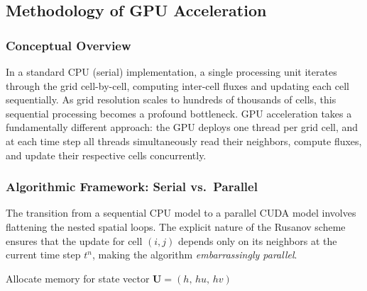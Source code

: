 \documentclass[10pt, conference]{FMFP2023}
\begin{document}
\subsection{Methodology of GPU Acceleration}

\subsubsection{Conceptual Overview}

In a standard CPU (serial) implementation, a single processing unit
iterates through the grid cell-by-cell, computing inter-cell fluxes
and updating each cell sequentially.
As grid resolution scales to hundreds of thousands of cells, this
sequential processing becomes a profound bottleneck.
GPU acceleration takes a fundamentally different approach: the GPU
deploys one thread per grid cell, and at each time step all threads
simultaneously read their neighbors, compute fluxes, and update their
respective cells concurrently.

\subsubsection{Algorithmic Framework: Serial vs.\ Parallel}

The transition from a sequential CPU model to a parallel CUDA model
involves flattening the nested spatial loops.
The explicit nature of the Rusanov scheme ensures that the update for
cell $(i,j)$ depends only on its neighbors at the current time step
$t^n$, making the algorithm \emph{embarrassingly parallel}.
\begin{algorithm}[t]
\caption{Serial CPU Execution}
\label{alg:cpu}
\SetAlgoLined
Allocate memory for state vector $\bm{U} = (h,\,hu,\,hv)$\;
\end{algorithm}
\end{document}

